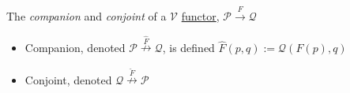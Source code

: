 The \emph{companion} and \emph{conjoint} of a $\mathcal{V}$ \href{doc/1 math/Seven Sketches in Compositionality/Chapter 2: Resource theories/4 Constructions on V-categories/2 Enriched functors/1 V-functor}{functor}, $\mathcal{P}\xrightarrow{F}\mathcal{Q}$

\begin{itemize}
    \item  Companion, denoted $\mathcal{P}\overset{\hat F}\nrightarrow \mathcal{Q}$, is defined $\hat{F}(p,q):=\mathcal{Q}(F(p),q)$
    \item Conjoint, denoted $\mathcal{Q}\overset{\check{F}}\nrightarrow\mathcal{P}$
  \end{itemize}
